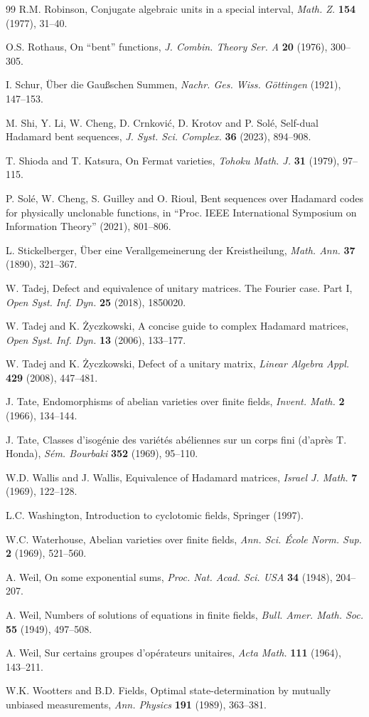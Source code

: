 \documentclass[11pt]{amsart}
\theoremstyle{definition}
\begin{document}
\begin{thebibliography}{99}
R.M. Robinson, Conjugate algebraic units in a special interval, {\em Math. Z.} {\bf 154} (1977), 31--40.

O.S. Rothaus, On ``bent'' functions, {\em J. Combin. Theory Ser. A} {\bf 20} (1976), 300--305.

I. Schur, \"Uber die Gau\ss schen Summen, {\em Nachr. Ges. Wiss. G\"ottingen} (1921), 147--153.

M. Shi, Y. Li, W. Cheng, D. Crnkovi\'c, D. Krotov and P. Sol\'e, Self-dual Hadamard bent sequences, {\em J. Syst. Sci. Complex.} {\bf 36} (2023), 894--908.

T. Shioda and T. Katsura, On Fermat varieties, {\em Tohoku Math. J.} {\bf 31} (1979), 97--115.

P. Sol\'e, W. Cheng, S. Guilley and O. Rioul, Bent sequences over Hadamard codes for physically unclonable functions, in ``Proc. IEEE International Symposium on Information Theory'' (2021), 801--806.

L. Stickelberger, \"Uber eine Verallgemeinerung der Kreistheilung, {\em Math. Ann.} {\bf 37} (1890), 321--367.

W. Tadej, Defect and equivalence of unitary matrices. The Fourier case. Part I, {\em Open Syst. Inf. Dyn.} {\bf 25} (2018), 1850020.

W. Tadej and K. \.Zyczkowski, A concise guide to complex Hadamard matrices, {\em Open Syst. Inf. Dyn.} {\bf 13} (2006), 133--177.

W. Tadej and K. \.Zyczkowski, Defect of a unitary matrix, {\em Linear Algebra Appl.} {\bf 429} (2008), 447--481.

J. Tate, Endomorphisms of abelian varieties over finite fields, {\em Invent. Math.} {\bf 2} (1966), 134--144.

J. Tate, Classes d'isog\'enie des vari\'et\'es ab\'eliennes sur un corps fini (d'apr\`es T. Honda), {\em S\'em. Bourbaki} {\bf 352} (1969), 95--110.

W.D. Wallis and J. Wallis, Equivalence of Hadamard matrices, {\em Israel J. Math.} {\bf 7} (1969), 122--128.

L.C. Washington, Introduction to cyclotomic fields, Springer (1997).

W.C. Waterhouse, Abelian varieties over finite fields, {\em Ann. Sci. \'Ecole Norm. Sup.} {\bf 2} (1969), 521--560.

A. Weil, On some exponential sums, {\em Proc. Nat. Acad. Sci. USA} {\bf 34} (1948), 204--207.

A. Weil, Numbers of solutions of equations in finite fields, {\em Bull. Amer. Math. Soc.} {\bf 55} (1949), 497--508.

A. Weil, Sur certains groupes d'op\'erateurs unitaires, {\em Acta Math.} {\bf 111} (1964), 143--211.

W.K. Wootters and B.D. Fields, Optimal state-determination by mutually unbiased measurements, {\em Ann. Physics} {\bf 191} (1989), 363--381.

\end{thebibliography}
\end{document}

